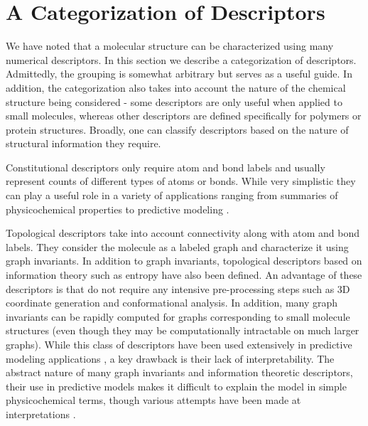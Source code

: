 \documentclass[letterpaper, 12pt]{article}
\begin{document}
\section{A Categorization of Descriptors}
\label{sec:categ-descr}

We have noted that a molecular structure can be characterized using
many numerical descriptors. In this section we describe a
categorization of descriptors. Admittedly, the grouping is somewhat
arbitrary but serves as a useful guide. In addition, the
categorization also takes into account the nature of the chemical
structure being considered - some descriptors are only useful when
applied to small molecules, whereas other descriptors are defined
specifically for polymers or protein structures.  Broadly, one can
classify descriptors based on the nature of structural information
they require.

Constitutional descriptors only require atom and bond labels and
usually represent counts of different types of atoms or bonds. While
very simplistic they can play a useful role in a variety of
applications ranging from summaries of physicochemical properties to
predictive modeling \cite{Bender:2005aa}.

Topological descriptors take into account connectivity along with atom
and bond labels. They consider the molecule as a labeled graph and
characterize it using graph invariants. In addition to graph
invariants, topological descriptors based on information theory such
as entropy have also been defined\cite{Dehmer:2009uq}. An advantage of
these descriptors is that do not require any intensive pre-processing
steps such as 3D coordinate generation and conformational analysis. In
addition, many graph invariants can be rapidly computed for graphs
corresponding to small molecule structures (even though they may be
computationally intractable on much larger graphs). While this class
of descriptors have been used extensively in predictive modeling
applications
\cite{Garcia-Domenech:2008aa,Randic:2001ad,Besalu:2001aa}, a key
drawback is their lack of interpretability. The abstract nature of
many graph invariants and information theoretic descriptors, their use
in predictive models makes it difficult to explain the model in simple
physicochemical terms, though various attempts have been made at
interpretations \cite{Todeschini:1975dq,Stanton:2003aa}.
\end{document}
